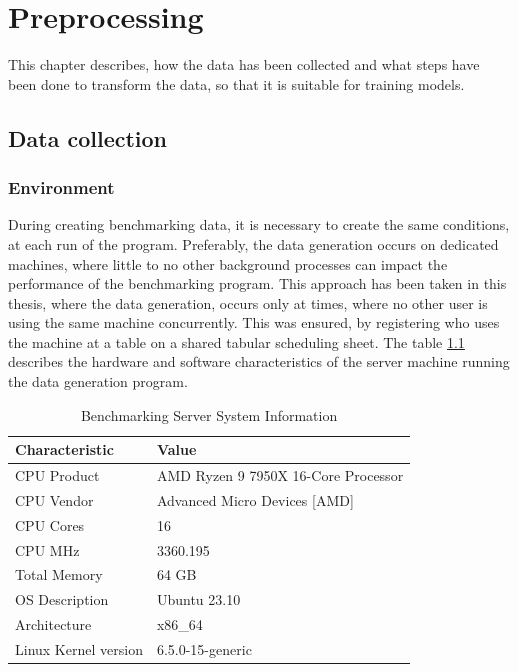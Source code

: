\chapter{Preprocessing}\label{chapter:preprocessing}
This chapter describes, how the data has been collected and what steps have been done to transform the data, so that it is suitable for training models.

\section{Data collection}
\subsection{Environment}
During creating benchmarking data, it is necessary to create the same conditions, at each run of the program. Preferably, the data generation occurs on dedicated machines, where little to no other background processes can impact the performance of the benchmarking program. This approach has been taken in this thesis, where the data generation, occurs only at times, where no other user is using the same machine concurrently. This was ensured, by registering who uses the machine at a table on a shared tabular scheduling sheet. The table \ref{tab:system_info} describes the hardware and software characteristics of the server machine running the data generation program. 

\begin{table}[h]
\centering
\begin{tabular}{|l|l|}
\hline
\textbf{Characteristic} & \textbf{Value} \\ \hline
CPU Product & AMD Ryzen 9 7950X 16-Core Processor \\ \hline
CPU Vendor & Advanced Micro Devices [AMD] \\ \hline
CPU Cores & 16 \\ \hline
CPU MHz & 3360.195 \\ \hline
Total Memory & 64 GB \\ \hline
OS Description & Ubuntu 23.10 \\ \hline
Architecture & x86\_64 \\ \hline
Linux Kernel version & 6.5.0-15-generic \\ \hline
\end{tabular}
\caption{Benchmarking Server System Information}
\label{tab:system_info}
\end{table}

